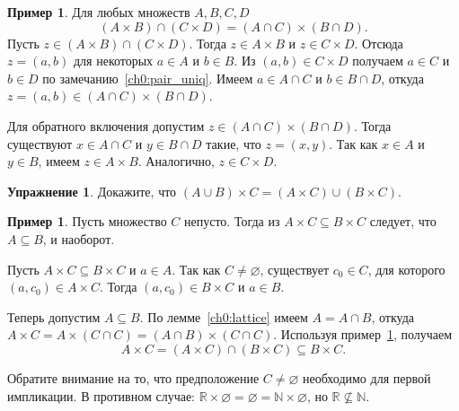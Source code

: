 \documentclass[12pt,notitlepage]{article}
\theoremstyle{plain}
\theoremstyle{definition}
\newtheorem{exc}[thm]{Упражнение}
\newtheorem{exm}[thm]{Пример}
\theoremstyle{plain}
\newcommand{\N}{\mathbb{N}}
\newcommand{\R}{\mathbb{R}}
\newcommand{\sbs}{\subseteq}
\newcommand{\void}{\varnothing}
\newcommand{\1}{\mathbf{1}}
\newcommand{\0}{\mathbf{0}}
\newcommand{\mcomm}[1]{}
\begin{document}
\begin{exm}\label{ch0:exm32}
	Для любых множеств $A, B, C, D$ 
	$$(A \times B) \cap (C \times D) = (A \cap C) \times (B \cap D).$$
	Пусть $z \in (A \times B) \cap (C \times D)$. Тогда $z \in A \times B$ и $z \in C \times D$.  Отсюда $z = (a,b)$ для некоторых $a \in A$ и $b\in B$. Из $(a,b) \in C \times D$ получаем $a \in C$ и $b \in D$ по замечанию~\ref{ch0:pair_uniq}. Имеем $a \in A \cap C$ и $b \in B \cap D$, откуда $z = (a, b) \in (A \cap C) \times (B \cap D)$.
	
	Для обратного включения допустим $z \in (A \cap C) \times (B \cap D)$. Тогда существуют $x \in A \cap C$ и $y \in B \cap D$ такие, что $z = (x, y)$. Так как $x \in A$ и $y \in B$, имеем $z \in A \times B$. Аналогично, $z \in C \times D$.
\end{exm}
\mcomm{We will allow more laxity (like in saying ``let $(x, y) \in (A \times B) \cap (C \times D)$'') in treating pairs when the students have clearly understood (hopefully) that one owes all such laxity solely to Lemma~\ref{ch0:pair}.}

\begin{exc}
	Докажите, что
	$(A \cup B) \times C = (A \times C) \cup (B \times C).$
\end{exc}

\begin{exm}\label{ch0:exm34}
	Пусть множество $C$ непусто. Тогда из $A \times C \sbs B \times C$ следует, что $A \sbs B$, и наоборот.
	
	Пусть $A \times C \sbs B \times C$ и $a \in A$. Так как $C \neq \void$, существует $c_0 \in C$, для которого $(a,c_0) \in A \times C$. Тогда $(a,c_0) \in B \times C$ и $a \in B$.
	
	Теперь допустим $A \sbs B$. По лемме~\ref{ch0:lattice} имеем $A = A \cap B$, откуда $A \times C = A \times (C \cap C) = (A \cap B) \times (C \cap C)$. Используя пример~\ref{ch0:exm32}, получаем
	$$A \times C = (A \times C) \cap (B \times C) \sbs B \times C.$$
\end{exm}
Обратите внимание на то, что предположение $C \neq \void$ необходимо для первой импликации. В противном случае: $\R \times \void = \void = \N \times \void$, но $\R \not\sbs \N$.

\mcomm{The clear resemblance of this statement to the cancellation laws for numerical multiplication is noteworthy. In this one and many examples that follow, the Instructor should try to persuade the students, that the Cartesian \emph{product} is a ``product'' indeed.}
\end{document}
